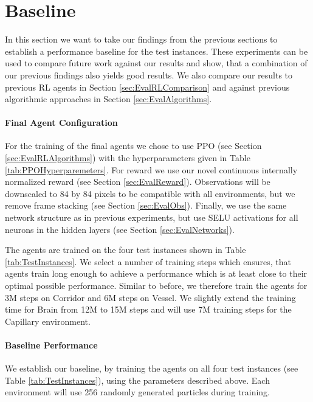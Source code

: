 \section{Baseline} \label{sec:EvalBaseline}
In this section we want to take our findings from the previous sections to establish a performance baseline for the test instances. These experiments can be used to compare future work against our results and show, that a combination of our previous findings also yields good results. We also compare our results to previous RL agents in Section \ref{sec:EvalRLComparison} and against previous algorithmic approaches in Section \ref{sec:EvalAlgorithms}.

\paragraph{Final Agent Configuration}
For the training of the final agents we chose to use PPO (see Section \ref{sec:EvalRLAlgorithms}) with the hyperparameters given in Table \ref{tab:PPOHyperparemeters}. For reward we use our novel continuous internally normalized reward (see Section \ref{sec:EvalReward}). Observations will be downscaled to 84 by 84 pixels to be compatible with all environments, but we remove frame stacking (see Section \ref{sec:EvalObs}). Finally, we use the same network structure as in previous experiments, but use SELU activations for all neurons in the hidden layers (see Section \ref{sec:EvalNetworks}).

The agents are trained on the four test instances shown in Table \ref{tab:TestInstances}. We select a number of training steps which ensures, that agents train long enough to achieve a performance which is at least close to their optimal possible performance. Similar to before, we therefore train the agents for 3M steps on Corridor and 6M steps on Vessel. We slightly extend the training time for Brain from 12M to 15M steps and will use 7M training steps for the Capillary environment.


\paragraph{Baseline Performance}
We establish our baseline, by training the agents on all four test instances (see Table \ref{tab:TestInstances}), using the parameters described above. Each environment will use 256 randomly generated particles during training. 

